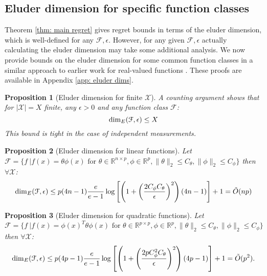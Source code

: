 \documentclass{article}
\newtheorem{prop}{Proposition}
\newcommand{\Real}{\mathds{R}}
\newcommand{\Xc}{\mathcal{X}}
\newcommand{\Fc}{\mathcal{F}}
\begin{document}
\subsection{Eluder dimension for specific function classes}
Theorem \ref{thm: main regret} gives regret bounds in terms of the eluder dimension, which is well-defined for any $\Fc, \epsilon$.
However, for any given $\Fc,\epsilon$ actually calculating the eluder dimension may take some additional analysis.
We now provide bounds on the eluder dimension for some common function classes in a similar approach to earlier work for real-valued functions \cite{russo2013}.
These proofs are available in Appendix \ref{app: eluder dims}.

\begin{prop}[Eluder dimension for finite $\mathcal{X}$]
\hspace{0.00000000000001mm} \newline
A counting argument shows that for $| \mathcal{X} | = X$ finite, any $\epsilon>0$ and any function class $\Fc$:
$$ {\rm dim}_E( \mathcal{F}, \epsilon) \le X $$
This bound is tight in the case of independent measurements.
\end{prop}

\begin{prop}[Eluder dimension for linear functions]
\label{prop: eluder lin}
\hspace{0.00000000000001mm} \newline
Let $\mathcal{F} = \{ f \ | f(x) = \theta \phi(x)  \text{ for } \theta \in \Real^{n \times p}, \phi \in \Real^p ,
\|\theta \|_2 \le C_\theta , \|\phi\|_2 \le C_\phi \}$
then $\forall \mathcal{X}$:
$$ {\rm dim}_E(\Fc, \epsilon) \le p(4n-1)\frac{e}{e-1} \log\left[ \left(1+\left( \frac{2C_\phi C_\theta}{\epsilon}\right)^2 \right)\left(4n-1\right) \right] + 1 = \tilde{O}(np) $$
\end{prop}

\begin{prop}[Eluder dimension for quadratic functions]
\hspace{0.00000000000001mm} \newline
Let $\mathcal{F} = \{ f \ | f(x) = \phi(x)^T \theta \phi(x)  \text{ for } \theta \in \Real^{p \times p}, \phi \in \Real^p ,
\|\theta \|_2 \le C_\theta , \|\phi\|_2 \le C_\phi \}$
then $\forall \Xc$:
$$ {\rm dim}_E(\Fc, \epsilon) \le p(4p-1)\frac{e}{e-1} \log\left[ \left(1+\left( \frac{2 p C_\phi^2 C_\theta}{\epsilon}\right)^2 \right)\left(4p-1\right) \right] + 1 = \tilde{O}(p^2). $$
\end{prop}
\end{document}
